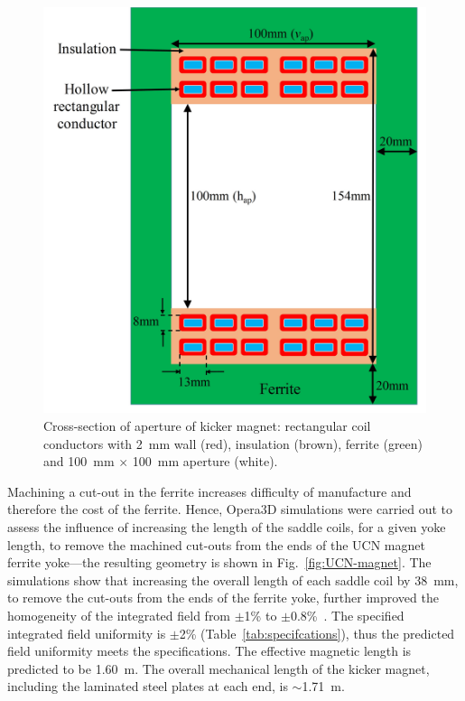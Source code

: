 \documentclass[aps,prab,twocolumn,superscriptaddress]{revtex4-1}
\begin{document}
\begin{figure}[t]
	\includegraphics[width=\linewidth]{ApertureCrossSection.jpg}
	\caption{Cross-section of aperture of kicker magnet: rectangular coil conductors with 2~mm wall (red), insulation (brown), ferrite (green) and 100~mm $\times$ 100~mm aperture (white).}
	\label{fig:ApertureCrossSection}
\end{figure}
Machining a cut-out in the ferrite increases difficulty of manufacture and therefore the cost of the ferrite. Hence,  
Opera3D simulations were carried out to assess the influence of increasing the length of the saddle coils, for a given yoke length, to remove the machined cut-outs from the ends of the UCN magnet ferrite yoke---the resulting geometry is shown in Fig.~\ref{fig:UCN-magnet}. The simulations show that increasing the overall length of each saddle coil by 38~mm, to remove the cut-outs from the ends of the ferrite yoke, further improved the homogeneity of the integrated field from $\pm$1\% to $\pm$0.8\%~\cite{Hahn}. The specified integrated field uniformity is $\pm$2\% (Table~\ref{tab:specifcations}), thus the predicted field uniformity meets the specifications. The effective magnetic length is predicted to be 1.60~m. The overall mechanical length of the kicker magnet, including the laminated steel plates at each end, is $\sim$1.71~m. 
\end{document}

